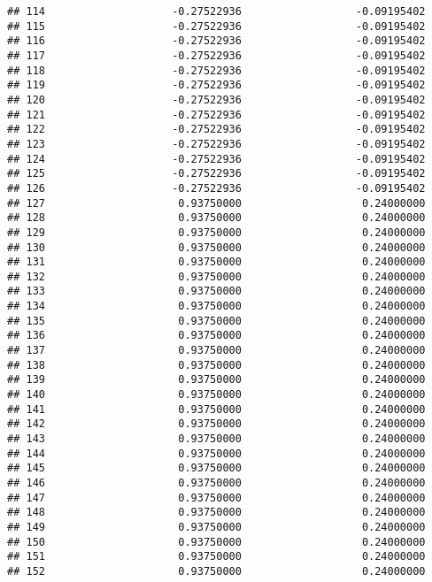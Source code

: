 \documentclass[]{article}
\begin{document}
\begin{verbatim}
## 114                    -0.27522936                  -0.09195402
## 115                    -0.27522936                  -0.09195402
## 116                    -0.27522936                  -0.09195402
## 117                    -0.27522936                  -0.09195402
## 118                    -0.27522936                  -0.09195402
## 119                    -0.27522936                  -0.09195402
## 120                    -0.27522936                  -0.09195402
## 121                    -0.27522936                  -0.09195402
## 122                    -0.27522936                  -0.09195402
## 123                    -0.27522936                  -0.09195402
## 124                    -0.27522936                  -0.09195402
## 125                    -0.27522936                  -0.09195402
## 126                    -0.27522936                  -0.09195402
## 127                     0.93750000                   0.24000000
## 128                     0.93750000                   0.24000000
## 129                     0.93750000                   0.24000000
## 130                     0.93750000                   0.24000000
## 131                     0.93750000                   0.24000000
## 132                     0.93750000                   0.24000000
## 133                     0.93750000                   0.24000000
## 134                     0.93750000                   0.24000000
## 135                     0.93750000                   0.24000000
## 136                     0.93750000                   0.24000000
## 137                     0.93750000                   0.24000000
## 138                     0.93750000                   0.24000000
## 139                     0.93750000                   0.24000000
## 140                     0.93750000                   0.24000000
## 141                     0.93750000                   0.24000000
## 142                     0.93750000                   0.24000000
## 143                     0.93750000                   0.24000000
## 144                     0.93750000                   0.24000000
## 145                     0.93750000                   0.24000000
## 146                     0.93750000                   0.24000000
## 147                     0.93750000                   0.24000000
## 148                     0.93750000                   0.24000000
## 149                     0.93750000                   0.24000000
## 150                     0.93750000                   0.24000000
## 151                     0.93750000                   0.24000000
## 152                     0.93750000                   0.24000000

\end{verbatim}
\end{document}
